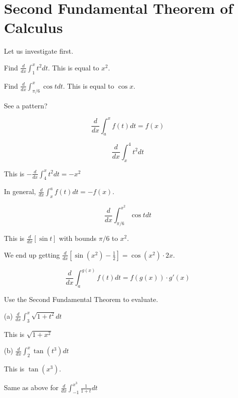 \documentclass[../bccalc.tex]{subfiles}
\begin{document}
\section{Second Fundamental Theorem of Calculus}
Let us investigate first.

Find $\frac{d}{dx}\int_1^x t^2 dt$. This is equal to $x^2$.

Find $\frac{d}{dx}\int_{\pi/6}^x \cos t dt$. This is equal to $\cos x$.

See a pattern?

\begin{theorem}
    \[ \frac{d}{dx}\int_a^x f(t)dt=f(x)\]
\end{theorem}

\pagebreak
\begin{example}
    \[ \frac{d}{dx}\int_x^4 t^2 dt \]

    This is $-\frac{d}{dx}\int_4^x t^2 dt = -x^2$
\end{example}

In general, $\frac{d}{dx}\int_x^a f(t)dt = -f(x)$.

\begin{example}
    \[ \frac{d}{dx}\int_{\pi/6}^{x^2} \cos t dt \]

    This is $\frac{d}{dx}[\sin t]$ with bounds $\pi/6$ to $x^2$.

    We end up getting $\frac{d}{dx}[\sin (x^2)-\frac{1}{2}]=\cos (x^2)\cdot 2x$.
\end{example}

\begin{theorem}
    \[ \frac{d}{dx}\int_a^{g(x)}f(t)dt = f(g(x))\cdot g'(x) \]
\end{theorem}

\begin{example}
    Use the Second Fundamental Theorem to evaluate.

    (a) $\frac{d}{dx}\int_3^x \sqrt{1+t^2}dt$

    This is $\sqrt{1+x^2}$

    (b) $\frac{d}{dx}\int_2^x \tan(t^3)dt$

    This is $\tan(x^3)$.
\end{example}

\ex Same as above for $\frac{d}{dx}\int_{-1}^{x^3}\frac{1}{1+t}dt$
\end{document}
